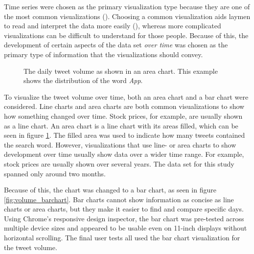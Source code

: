 Time series were chosen as the primary visualization type because they are one of the most common visualizations (\cite{heer2010}). Choosing a common visualization aids laymen to read and interpret the data more easily (\cite{borner2016}), whereas more complicated visualizations can be difficult to understand for those people. Because of this, the development of certain aspects of the data set \emph{over time} was chosen as the primary type of information that the visualizations should convey.

\begin{figure}[h!tb]
    \caption{The daily tweet volume as shown in an area chart. This example shows the distribution of the word \emph{App}.}
    \label{fig:volume_areachart}
\end{figure}

To visualize the tweet volume over time, both an area chart and a bar chart were considered. Line charts and area charts are both common visualizations to show how something changed over time. Stock prices, for example, are usually shown as a line chart. An area chart is a line chart with its areas filled, which can be seen in figure \ref{fig:volume_areachart}. The filled area was used to indicate how many tweets contained the search word. However, visualizations that use line- or area charts to show development over time usually show data over a wider time range. For example, stock prices are usually shown over several years. The data set for this study spanned only around two months.

Because of this, the chart was changed to a bar chart, as seen in figure \ref{fig:volume_barchart}. Bar charts cannot show information as concise as line charts or area charts, but they make it easier to find and compare specific days. Using Chrome's responsive design inspector, the bar chart was pre-tested across multiple device sizes and appeared to be usable even on 11-inch displays without horizontal scrolling. The final user tests all used the bar chart visualization for the tweet volume.

